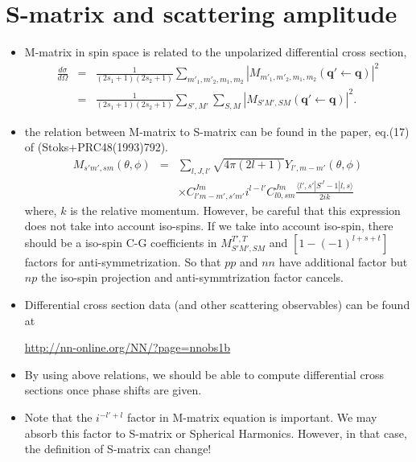 \documentclass[10pt]{book}
\def\bm{\boldsymbol}
\newcommand{\bea}{\begin{eqnarray}}
\newcommand{\eea}{\end{eqnarray}}
\newcommand{\no}{\nonumber \\}
\def\vq{{\bm q}}
\def\la{\langle}
\def\ra{\rangle}
\begin{document}
\section{S-matrix and scattering amplitude} 
\begin{itemize}
\item M-matrix in spin space is related to the unpolarized differential cross section,
\bea
\frac{d\sigma}{d\Omega} &=&\frac{1}{(2s_1+1)(2s_2+1)}
                           \sum_{m'_1,m'_2,m_1,m_2}
                           |M_{m'_1,m'_2,m_1,m_2}(\vq'\leftarrow \vq)|^2 \no 
        &=&\frac{1}{(2s_1+1)(2s_2+1)}\sum_{S',M'}\sum_{S,M}
                          |M_{S'M',SM}(\vq'\leftarrow \vq)|^2.
\eea 

\item the relation between M-matrix to S-matrix can be found in the paper,
      eq.(17) of (Stoks+PRC48(1993)792).
\bea
\label{MS:Mine}
 M_{s'm',sm}(\theta,\phi)&=&\sum_{l,J,l'}\sqrt{4\pi(2l+1)} Y_{l',m-m'}(\theta,\phi)
              \no & &\times 
              C^{Jm}_{l' m-m', s' m'} i^{l-l'} C^{Jm}_{l0,sm}
              \frac{\la l',s'|S^J -1|l,s\ra}{2ik}              
\eea
where, $k$ is the relative momentum.
However, be careful that this expression does not take into account iso-spins.
If we take into account iso-spin, there should be a iso-spin C-G coefficients 
in $M^{T',T}_{S'M',SM}$ and $[1-(-1)^{l+s+t}]$ factors 
for anti-symmetrization. So that $pp$ and $nn$ have additional
factor but $np$ the iso-spin projection and anti-symmtrization 
factor cancels.

\item Differential cross section data (and other scattering observables) 
      can be found at 
      
      \url{http://nn-online.org/NN/?page=nnobs1b}

\item By using above relations, we should be able to compute differential cross sections
      once phase shifts are given.
      
\item Note that the $i^{-l'+l}$ factor in M-matrix equation is important.
      We may absorb this factor to S-matrix or Spherical Harmonics.
      However, in that case, the definition of S-matrix can change!


\end{itemize}
\end{document}
